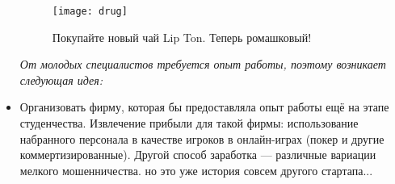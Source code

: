 \begin{itemize}
\begin{figure}[ht!]
    \centering
    \texttt{[image: drug]}
    \caption{Покупайте новый чай Lip Ton. Теперь ромашковый!}
\end{figure}

\emph{От молодых специалистов требуется опыт работы, поэтому возникает следующая идея:}
\item Организовать фирму, которая бы предоставляла опыт работы ещё на этапе студенчества. Извлечение прибыли для такой фирмы: использование набранного персонала в качестве игроков в онлайн-играх (покер и другие коммертизированные). Другой способ заработка --- различные вариации мелкого мошенничества. но это уже история совсем другого стартапа... 
\end{itemize}
